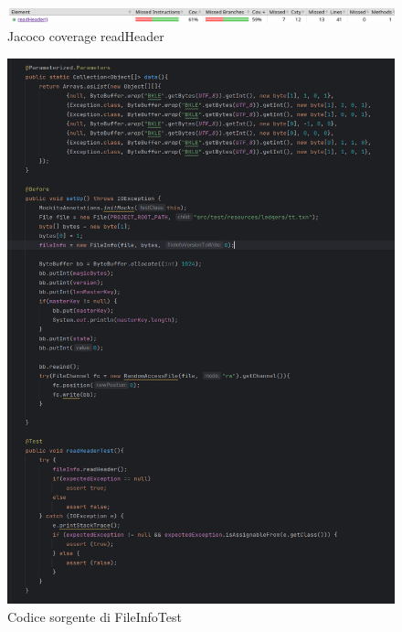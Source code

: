 \documentclass[12pt, a4paper]{article}
\begin{document}
  \begin{figure}
    \includegraphics[width=\linewidth]{./images/file_info/JacocoCoveragereadHeader1.png}
    \caption{Jacoco coverage readHeader}
    \label{fig:JacocoCoveragereadHeader1}
  \end{figure}
  \begin{figure}
    \includegraphics[width=\linewidth]{./images/file_info/Code1ReadHeader.png}
    \caption{Codice sorgente di FileInfoTest}
    \label{fig:Code1ReadHeader}
  \end{figure}
  
  
\end{document}
